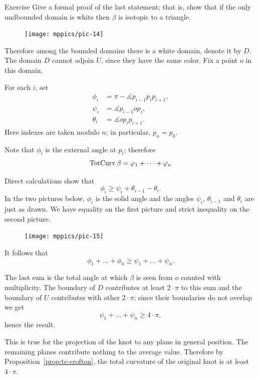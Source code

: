 \begin{thm}{Exercise}
Give a formal proof of the last statement; that is, show that if the only undbounded domain is white then $\beta$ is isotopic to a triangle. 
\end{thm}

\begin{figure}
\vskip-4mm
\centering
\texttt{[image: mppics/pic-14]}
\vskip0mm
\end{figure}

Therefore among the bounded domains there is a white domain, denote it by $D$.
The domain $D$ cannot adjoin %
$U$, since they have the same color.
Fix a point $o$ in this domain.

For each $i$, set 
\begin{align*}
\phi_i&=\pi-\measuredangle p_{i-1}p_ip_{i+1},
\\
\psi_i&=\measuredangle p_{i-1} o p_{i},
\\
\theta_i&=\measuredangle o p_i p_{i+1}.
\end{align*}
Here indexes are taken modulo $n$; in particular, $p_{n}=p_0$.


Note that $\phi_i$ is the external angle at $p_i$;
therefore 
\[\mathop{\rm TotCurv}\nolimits\beta= \varphi_1+\dots+\varphi_n\]

Direct calculations show that 
\[\phi_i\ge \psi_i+\theta_{i-1}-\theta_i.\]
In the two pictures below, $\phi_i$ is the solid angle and 
the angles $\psi_i$, $\theta_{i-1}$ and $\theta_i$
are just as drawn.
We have equality on the first picture and strict inequality on the second picture.

\begin{figure}[h]
\vskip-0mm
\centering
\texttt{[image: mppics/pic-15]}
\vskip0mm
\end{figure}

It follows that 
\[\phi_1+\dots+\phi_n\ge \psi_1+\dots+\psi_n.\]

The last sum 
is the total angle at  which $\beta$ is seen from $o$ counted with multiplicity. 
The boundary of $D$ contributes at least $2\cdot\pi$ to this sum and the boundary of $U$ contributes with other $2\cdot\pi$;
since their boundaries do not overlap we get 
\[\psi_1+\dots+\psi_n\ge 4\cdot\pi,\]
hence the result.

This is true for the projection of the knot to any plane in general position.
The remaining planes contribute nothing to the average value.
Therefore by Proposition~\ref{prop:tc-crofton}, the total curvature of the original knot is at least $4\cdot\pi$.
\qeds



